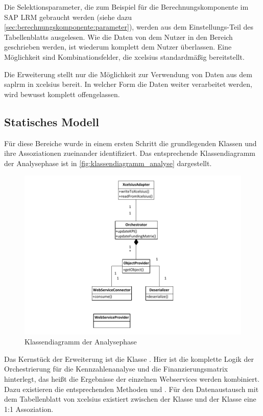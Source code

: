 \begin{onehalfspacing}
Die Selektionsparameter, die zum Beispiel für die Berechnungskomponente im SAP LRM gebraucht werden (siehe dazu \vref{sec:berechnungskomponente:parameter}), werden aus dem Ein\-stel\-lungs-Teil des Tabellenblatts ausgelesen. Wie die Daten von dem Nutzer in den Bereich geschrieben werden, ist wiederum komplett dem Nutzer überlassen. Eine Möglichkeit sind Kombinationsfelder, die \gls{xcelsius} standardmäßig bereitstellt.

Die Erweiterung stellt nur die Möglichkeit zur Verwendung von Daten aus dem \gls{saplrm} in \gls{xcelsius} bereit. In welcher Form die Daten weiter verarbeitet werden, wird bewusst komplett offengelassen.

\subsection{Statisches Modell}
Für diese Bereiche wurde in einem ersten Schritt die grundlegenden Klassen und ihre Assoziationen zueinander identifiziert. Das entsprechende Klassendiagramm der Analysephase ist in \vref{fig:klassendiagramm_analyse} dargestellt.

\begin{figure}[ht]
\centering
\setlength{\unitlength}{1mm}
\includegraphics[width=15cm]{Visio/Analyse.pdf}
\caption{Klassendiagramm der Analysephase \label{fig:klassendiagramm_analyse}}
\end{figure}

Das Kernstück der Erweiterung ist die Klasse . Hier ist die komplette Logik der Orchestrierung für die Kennzahlenanalyse und die Finanzierungsmatrix hinterlegt, das heißt die Ergebnisse der einzelnen Webservices werden kombiniert. Dazu existieren die entsprechenden Methoden  und . Für den Datenaustausch mit dem Tabellenblatt von \gls{xcelsius} existiert zwischen der Klasse  und der Klasse  eine 1:1 Assoziation.


\end{onehalfspacing}

